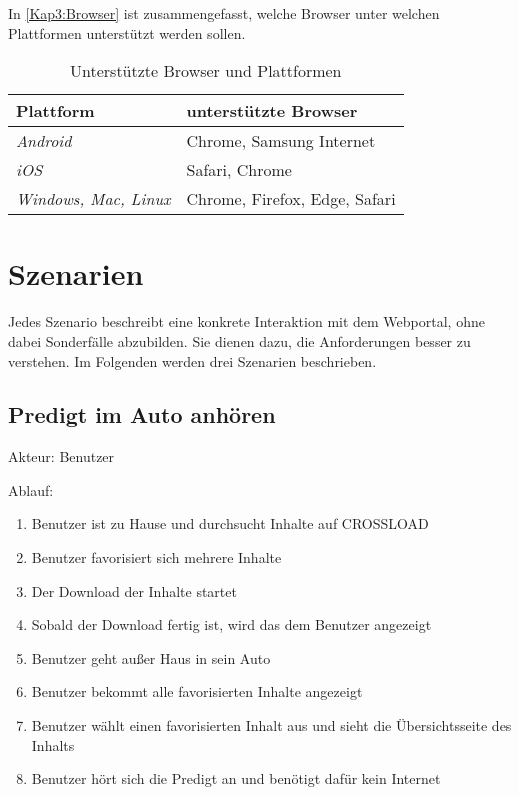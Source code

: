 In \autoref{Kap3:Browser} ist zusammengefasst, welche Browser unter welchen Plattformen unterstützt werden sollen.

\begin{table}
  \renewcommand{\arraystretch}{1.2}
  \centering
  \sffamily
  \begin{footnotesize}
    \begin{tabular}{l l}
      \toprule
      \textbf{Plattform} & \textbf{unterstützte Browser} \\
      \midrule
      \emph{Android} & Chrome, Samsung Internet \\
      \emph{iOS} & Safari, Chrome \\
      \emph{Windows, Mac, Linux} & Chrome, Firefox, Edge, Safari \\
      \bottomrule
    \end{tabular}
  \end{footnotesize}
  \rmfamily
  \caption{Unterstützte Browser und Plattformen}
  \label{Kap3:Browser}
\end{table}

\section{Szenarien}
\label{Kap3:Szenarien}
Jedes Szenario beschreibt eine konkrete Interaktion mit dem Webportal, ohne dabei Sonderfälle abzubilden. Sie dienen dazu, die Anforderungen besser zu verstehen. Im Folgenden werden drei Szenarien beschrieben.

\subsection{Predigt im Auto anhören}
Akteur: Benutzer

Ablauf:
\begin{enumerate}
	\item Benutzer ist zu Hause und durchsucht Inhalte auf CROSSLOAD
	\item Benutzer favorisiert sich mehrere Inhalte
	\item Der Download der Inhalte startet
	\item Sobald der Download fertig ist, wird das dem Benutzer angezeigt
	\item Benutzer geht außer Haus in sein Auto
	\item Benutzer bekommt alle favorisierten Inhalte angezeigt
	\item Benutzer wählt einen favorisierten Inhalt aus und sieht die Übersichtsseite des Inhalts
	\item Benutzer hört sich die Predigt an und benötigt dafür kein Internet
\end{enumerate}


